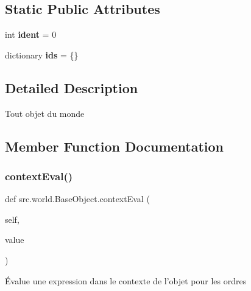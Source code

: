 \subsection*{Static Public Attributes}
\begin{DoxyCompactItemize}
\item 
\hypertarget{classsrc_1_1world_1_1_base_object_a6729207ecb57b1def5bb681862926ea5}{}\label{classsrc_1_1world_1_1_base_object_a6729207ecb57b1def5bb681862926ea5} 
int {\bfseries ident} = 0
\item 
\hypertarget{classsrc_1_1world_1_1_base_object_a7a6917fd5b990ddc76376ea70543dcbd}{}\label{classsrc_1_1world_1_1_base_object_a7a6917fd5b990ddc76376ea70543dcbd} 
dictionary {\bfseries ids} = \{\}
\end{DoxyCompactItemize}


\subsection{Detailed Description}
\begin{DoxyVerb}Tout objet du monde \end{DoxyVerb}
 

\subsection{Member Function Documentation}
\hypertarget{classsrc_1_1world_1_1_base_object_aeee31be3e8c0ada3fb6c7962cdd12e75}{}\label{classsrc_1_1world_1_1_base_object_aeee31be3e8c0ada3fb6c7962cdd12e75} 
\subsubsection{\texorpdfstring{context\+Eval()}{contextEval()}}
{\footnotesize\ttfamily def src.\+world.\+Base\+Object.\+context\+Eval (\begin{DoxyParamCaption}\item[{}]{self,  }\item[{}]{value }\end{DoxyParamCaption})}

\begin{DoxyVerb}Évalue une expression dans le contexte de l'objet pour les ordres \end{DoxyVerb}
 \hypertarget{classsrc_1_1world_1_1_base_object_a574e9fcdbf71cbd28518816acbe61504}{}\label{classsrc_1_1world_1_1_base_object_a574e9fcdbf71cbd28518816acbe61504} 

